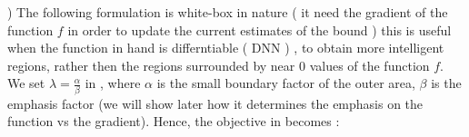 )
 The following formulation is white-box in nature ( it need the gradient of the function $f $ in order to update the current estimates of the bound ) this is useful when the function in hand is differntiable ( \eg DNN ) , to obtain more intelligent regions, rather then the regions surrounded by near 0 values of the function $f$. We set $\lambda = \frac{\alpha}{\beta}$ in \eqLabel{\ref{eq:loss-oir-sup}}, where $\alpha$ is the small boundary factor of the outer area, $\beta$ is the emphasis factor (we will show later how it determines the emphasis on the function vs the gradient). Hence, the objective in \eqLabel{\ref{eq:loss-oir-sup}} becomes :
